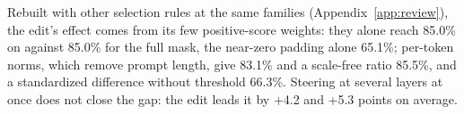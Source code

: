 Rebuilt with other selection rules at the same families (Appendix~\ref{app:review}), the edit's effect comes from its few positive-score weights: they alone reach 85.0\% on \LB{} against 85.0\% for the full mask, the near-zero padding alone 65.1\%; per-token norms, which remove prompt length, give 83.1\% and a scale-free ratio 85.5\%, and a standardized difference without threshold 66.3\%. Steering at several layers at once does not close the gap: the edit leads it by +4.2 and +5.3 points on average.